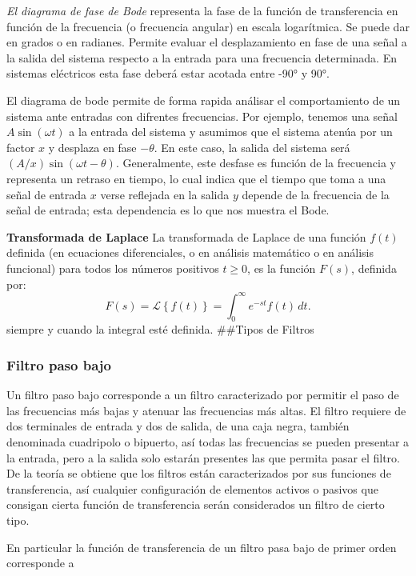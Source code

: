 \documentclass{article}
\begin{document}
\emph{El diagrama de fase de Bode} representa la fase de la función de
transferencia en función de la frecuencia (o frecuencia angular) en
escala logarítmica. Se puede dar en grados o en radianes. Permite
evaluar el desplazamiento en fase de una señal a la salida del sistema
respecto a la entrada para una frecuencia determinada. En sistemas
eléctricos esta fase deberá estar acotada entre -90° y 90°.

El diagrama de bode permite de forma rapida análisar el comportamiento
de un sistema ante entradas con difrentes frecuencias. Por ejemplo,
tenemos una señal $A\sin(\omega t)$ a la entrada del sistema y asumimos
que el sistema atenúa por un factor $x$ y desplaza en fase $−\theta$. En
este caso, la salida del sistema será $(A/x) \sin(\omega t − \theta)$.
Generalmente, este desfase es función de la frecuencia y representa un
retraso en tiempo, lo cual indica que el tiempo que toma a una señal de
entrada $x$ verse reflejada en la salida $y$ depende de la frecuencia de
la señal de entrada; esta dependencia es lo que nos muestra el Bode.

\textbf{Transformada de Laplace} La transformada de Laplace de una
función $f(t)$ definida (en ecuaciones diferenciales, o en análisis
matemático o en análisis funcional) para todos los números positivos
$t \geq 0$, es la función $F(s)$, definida por: \[
F(s) = \mathcal{L} \left\{f(t)\right\} =\int_{0}^\infty e^{-st} f(t)\,dt.
\] siempre y cuando la integral esté definida. \#\#Tipos de Filtros

\subsubsection{Filtro paso bajo}\label{filtro-paso-bajo}

Un filtro paso bajo corresponde a un filtro caracterizado por permitir
el paso de las frecuencias más bajas y atenuar las frecuencias más
altas. El filtro requiere de dos terminales de entrada y dos de salida,
de una caja negra, también denominada cuadripolo o bipuerto, así todas
las frecuencias se pueden presentar a la entrada, pero a la salida solo
estarán presentes las que permita pasar el filtro. De la teoría se
obtiene que los filtros están caracterizados por sus funciones de
transferencia, así cualquier configuración de elementos activos o
pasivos que consigan cierta función de transferencia serán considerados
un filtro de cierto tipo.

En particular la función de transferencia de un filtro pasa bajo de
primer orden corresponde a
\end{document}
